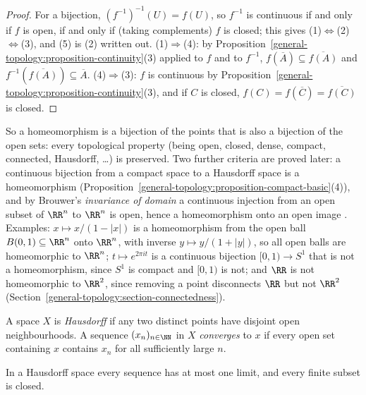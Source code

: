 \begin{proof}
For a bijection, $(f^{-1})^{-1}(U) = f(U)$, so $f^{-1}$ is continuous if and only if $f$ is open, if and only if (taking complements) $f$ is closed; this gives (1)$\Leftrightarrow$(2)$\Leftrightarrow$(3),
and (5) is (2) written out. (1)$\Rightarrow$(4): by Proposition~\ref{general-topology:proposition-continuity}(3) applied to $f$ and to $f^{-1}$, $f(\overline{A}) \subseteq \overline{f(A)}$ and
$f^{-1}(\overline{f(A)}) \subseteq \overline{A}$. (4)$\Rightarrow$(3): $f$ is continuous by Proposition~\ref{general-topology:proposition-continuity}(3), and if $C$ is closed, $f(C) = f(\overline{C}) =
\overline{f(C)}$ is closed.
\end{proof}

So a homeomorphism is a bijection of the points that is also a bijection of the open sets: every topological property (being open, closed, dense, compact, connected, Hausdorff, \ldots) is
preserved. Two further criteria are proved later: a continuous bijection from a compact space to a Hausdorff space is a homeomorphism
(Proposition~\ref{general-topology:proposition-compact-basic}(4)), and by Brouwer's \emph{invariance of domain} a continuous injection from an open subset of $\RR^n$ to $\RR^n$ is open, hence a
homeomorphism onto an open image \cite[Theorem 2B.3]{hatcher-at}. Examples: $x \mapsto x/(1 - |x|)$ is a homeomorphism from the open ball $B(0, 1) \subseteq \RR^n$ onto $\RR^n$, with inverse
$y \mapsto y/(1 + |y|)$, so all open balls are homeomorphic to $\RR^n$; $t \mapsto e^{2\pi it}$ is a continuous bijection $[0, 1) \to S^1$ that is not a homeomorphism, since $S^1$ is compact and
$[0, 1)$ is not; and $\RR$ is not homeomorphic to $\RR^2$, since removing a point disconnects $\RR$ but not $\RR^2$ (Section~\ref{general-topology:section-connectedness}).

\begin{definition}\label{general-topology:definition-hausdorff}
A space $X$ is \emph{Hausdorff} if any two distinct points have disjoint open neighbourhoods. A sequence $(x_n)_{n \in \NN}$ in $X$
\emph{converges} to $x$ if every open set containing $x$ contains $x_n$ for all sufficiently large $n$.
\end{definition}

\begin{lemma}\label{general-topology:lemma-hausdorff-limits}
In a Hausdorff space every sequence has at most one limit, and every finite subset is closed.
\end{lemma}

